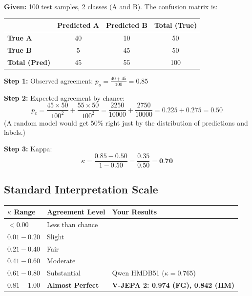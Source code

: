 \documentclass[12pt, a4paper]{article}
\begin{document}
\begin{examplebox}
\textbf{Given:} 100 test samples, 2 classes (A and B). The confusion matrix is:

\begin{center}
\begin{tabular}{lcc|c}
\toprule
& \textbf{Predicted A} & \textbf{Predicted B} & \textbf{Total (True)} \\
\midrule
\textbf{True A} & 40 & 10 & 50 \\
\textbf{True B} & 5 & 45 & 50 \\
\midrule
\textbf{Total (Pred)} & 45 & 55 & 100 \\
\bottomrule
\end{tabular}
\end{center}

\textbf{Step 1:} Observed agreement:
$p_o = \frac{40 + 45}{100} = 0.85$

\textbf{Step 2:} Expected agreement by chance:
\[
p_e = \frac{45 \times 50}{100^2} + \frac{55 \times 50}{100^2} = \frac{2250}{10000} + \frac{2750}{10000} = 0.225 + 0.275 = 0.50
\]
(A random model would get 50\% right just by the distribution of predictions and labels.)

\textbf{Step 3:} Kappa:
\[
\kappa = \frac{0.85 - 0.50}{1 - 0.50} = \frac{0.35}{0.50} = \textbf{0.70}
\]
\end{examplebox}

\subsection{Standard Interpretation Scale}

\begin{center}
\begin{tabular}{lll}
\toprule
\textbf{$\kappa$ Range} & \textbf{Agreement Level} & \textbf{Your Results} \\
\midrule
$< 0.00$ & Less than chance & \\
$0.01 - 0.20$ & Slight & \\
$0.21 - 0.40$ & Fair & \\
$0.41 - 0.60$ & Moderate & \\
$0.61 - 0.80$ & Substantial & Qwen HMDB51 ($\kappa = 0.765$) \\
\rowcolor{lightgreen}
$0.81 - 1.00$ & \textbf{Almost Perfect} & \textbf{V-JEPA 2: 0.974 (FG), 0.842 (HM)} \\
\bottomrule
\end{tabular}
\end{center}
\end{document}
